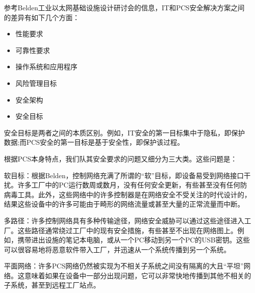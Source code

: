 参考Belden工业以太网基础设施设计研讨会的信息，IT和PCS安全解决方案之间的差异有如下几个方面：
\begin{itemize}
	\item 性能要求
	\item 可靠性要求
	\item 操作系统和应用程序
	\item 风险管理目标
	\item 安全架构
	\item 安全目标
\end{itemize}

安全目标是两者之间的本质区别。例如，IT安全的第一目标集中于隐私，即保护数据;而PCS安全的第一目标是基于安全性，即保护该过程。

根据PCS本身特点，我们队其安全要求的问题又细分为三大类。这些问题是：

软目标：根据Belden，控制网络充满了所谓的“软”目标，即设备易受到网络接口干扰。许多工厂中的PC运行数周或数月，没有任何安全更新，有些甚至没有任何防病毒工具。此外，这些网络中的许多控制器是在网络安全不受关注的时代设计的，结果这些设备中的许多可能由于畸形的网络流量或甚至大量的正常流量而中断。

多路径：许多控制网络具有多种传输途径，网络安全威胁可以通过这些途径进入工厂。这些路径通常绕过工厂中的现有安全措施，有些甚至不出现在网络图上。例如，携带进出设施的笔记本电脑，或从一个PC移动到另一个PC的USB密钥。这些可以很容易地将恶意软件带入工厂，并迅速从一个系统传播到另一个系统。

平面网络：许多PCS网络仍然被实现为不相关子系统之间没有隔离的大且“平坦”网络。这意味着如果在设备中一部分出现问题，它可以非常快地传播到其他不相关的子系统，甚至到远程工厂站点。

